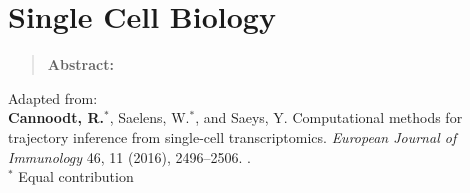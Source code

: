 \newpage{\thispagestyle{empty}\cleardoublepage}
\chapter{Single Cell Biology} 
\label{chap:singlecellbiology}

\begin{quote}
	\textbf{Abstract:} \blindtext
\end{quote}

\vfill

Adapted from:\\
\textbf{Cannoodt, R.}$^*$, Saelens, W.$^*$, and Saeys, Y. Computational methods for trajectory inference from single-cell transcriptomics. \textit{European Journal of Immunology} 46, 11 (2016), 2496--2506. .\\
{\footnotesize $^*$ Equal contribution}
\newpage

\blindtext